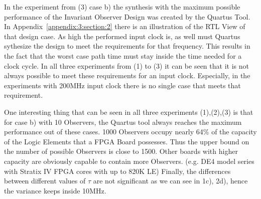 In the experiment from (3) case b) the synthesis with the maximum possible performance of the Invariant Observer Design was created by the Quartus Tool.
In Appendix~\ref{appendix:3:section:2} there is an illustration of the RTL View of that design case.
As high the performed input clock is, as well must Quartus sythesize the design to meet the requirements for that frequency. 
This results in the fact that the worst case path time must stay inside the time needed for a clock cycle. 
In all three experiments from (1) to (3) it can be seen that it is not always possible to meet these requirements for an input clock. 
Especially, in the experiments with 200MHz input clock there is no single case that meets that requirement. 
  
One interesting thing that can be seen in all three experiments (1),(2),(3) is that for case b) with 10 Observers, 
the Quartus tool always reaches the maximum performance out of these cases.
1000 Observers occupy nearly 64\% of the capacity of the Logic Elements that a FPGA Board possesses. 
Thus the upper bound on the number of possible Observers is close to 1500. 
Other boards with higher capacity are obviously capable to contain more Observers. (e.g. DE4 model series with Stratix IV FPGA cores with up to 820K LE)
Finally, the differences between different values of $\tau$ are not significant as we can see in 1c), 2d), hence the variance keeps inside 10MHz.

